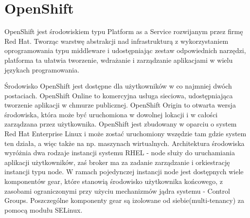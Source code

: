 
\section{OpenShift}
\label{sec:openShift}

OpenShift jest środowiskiem typu Platform as a Service rozwijanym przez firmę Red Hat. Tworząc warstwę abstrakcji nad infrastrukturą z wykorzystaniem oprogramowania typu middleware i udostępniając zestaw odpowiednich narzędzi, platforma ta ułatwia tworzenie, wdrażanie i zarządzanie aplikacjami w wielu językach programowania. 

Środowisko OpenShift jest dostępne dla użytkowników w co najmniej dwóch postaciach. OpenShift Online to komercyjna usługa sieciowa, udostępniająca tworzenie aplikacji w chmurze publicznej. OpenShift Origin to otwarta wersja środowiska, która może być uruchomiona w dowolnej lokacji i w całości zarządzana przez użytkownika.
OpenShift jest zbudowany w oparciu o system Red Hat Enterprise Linux i może zostać uruchomiony wszędzie tam gdzie system ten działa, a więc także na np. maszynach wirtualnych. Architektura środowiska wyróżnia dwa rodzaje instancji systemu RHEL - node służy do uruchamiania aplikacji użytkowników, zaś broker ma za zadanie zarządzanie i orkiestrację instancji typu node. W ramach pojedynczej instancji node jest dostępnych wiele komponentów gear, które stanowią środowisko użytkownika końcowego, z zasobami ograniczonymi przy użyciu mechanizmów jądra systemu - Control Groups. Poszczególne komponenty gear są izolowane od siebie(multi-tenancy) za pomocą modułu SELinux. 

